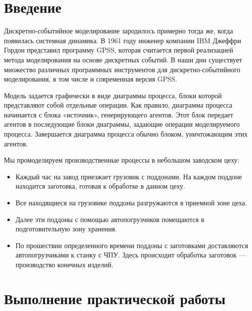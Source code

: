 \graphicspath{{./img}} %

\section*{\LARGE Введение}
Дискретно-событийное моделирование зародилось примерно тогда же, когда
появилась системная динамика. В 1961 году инженер компании IBM Джеффри
Гордон представил программу GPSS, которая считается первой реализацией
метода моделирования на основе дискретных событий. В наши дни существует
множество различных программных инструментов для дискретно-событийного
моделирования, в том числе и современная версия GPSS.\par
Модель задается графически в виде диаграммы процесса, блоки которой
представляют собой отдельные операции. Как правило, диаграмма процесса
начинается с блока «источник», генерирующего агентов. Этот блок передает
агентов в последующие блоки диаграммы, задающие операции моделируемого
процесса. Завершается диаграмма процесса обычно блоком, уничтожающим
этих агентов.\par
Мы промоделируем производственные процессы в небольшом заводском цеху:

\begin{itemize}
	\item Каждый час на завод приезжает грузовик с поддонами. На каждом
		поддоне находится заготовка, готовая к обработке в данном цеху.
	\item Все находящиеся на грузовике поддоны разгружаются
		в приемной зоне цеха.
	\item  Далее эти поддоны с помощью автопогрузчиков помещаются в
		подготовительную зону хранения.
	\item По прошествии определенного времени поддоны с заготовками
		доставляются автопогрузчиками к станку с ЧПУ. Здесь происходит
		обработка заготовок --- производство конечных изделий.
\end{itemize}

\clearpage

\section*{\LARGE Выполнение практической работы}

